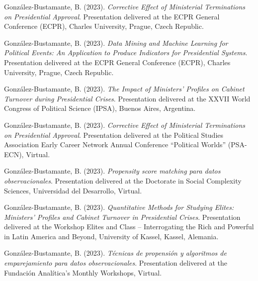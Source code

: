\begin{publications}

\begin{benumerate}{87}

\item{González-Bustamante, B. (2023). {\itshape Corrective Effect of Ministerial Terminations on Presidential Approval}. Presentation delivered at the ECPR General Conference (ECPR), Charles University, Prague, Czech Republic.}\vspace{1mm}

\item{González-Bustamante, B. (2023). {\itshape Data Mining and Machine Learning for Political Events: An Application to Produce Indicators for Presidential Systems}. Presentation delivered at the ECPR General Conference (ECPR), Charles University, Prague, Czech Republic.}\vspace{1mm}

\item{González-Bustamante, B. (2023). {\itshape The Impact of Ministers' Profiles on Cabinet Turnover during Presidential Crises}. Presentation delivered at the XXVII World Congress of Political Science (IPSA), Buenos Aires, Argentina.}\vspace{1mm}

\item{González-Bustamante, B. (2023). {\itshape Corrective Effect of Ministerial Terminations on Presidential Approval}. Presentation delivered at the Political Studies Association Early Career Network Annual Conference ``Political Worlds'' (PSA-ECN), Virtual.}\vspace{1mm}

\item{González-Bustamante, B. (2023). {\itshape Propensity score matching para datos observacionales}. Presentation delivered at the Doctorate in Social Complexity Sciences, Universidad del Desarrollo, Virtual.}\vspace{1mm}

\item{González-Bustamante, B. (2023). {\itshape Quantitative Methods for Studying Elites: Ministers' Profiles and Cabinet Turnover in Presidential Crises}. Presentation delivered at the Workshop Elites and Class -- Interrogating the Rich and Powerful in Latin America and Beyond, University of Kassel, Kassel, Alemania.}\vspace{1mm}

\item{González-Bustamante, B. (2023). {\itshape Técnicas de propensión y algoritmos de emparejamiento para datos observacionales}. Presentation delivered at the Fundación Analítica's Monthly Workshops, Virtual.}\vspace{1mm}


\end{benumerate}
\end{publications}
